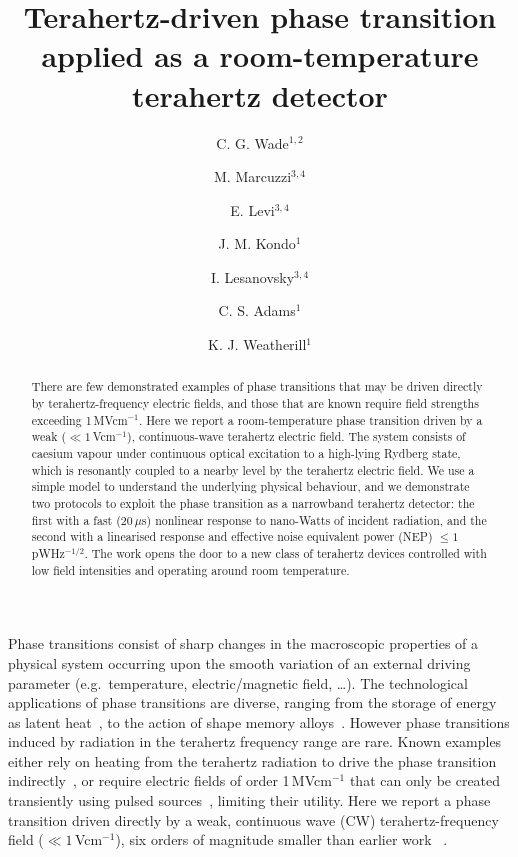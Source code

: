 \documentclass[twocolumn,aps,prl,nobibnotes,8pt]{revtex4-1}
\begin{document}
\title{Terahertz-driven phase transition applied as a room-temperature terahertz detector}
\author{C. G. Wade$^{1,2}$}
\author{M. Marcuzzi$^{3,4}$}
\author{E. Levi$^{3,4}$}
\author{J. M. Kondo$^{1}$}
\author{I. Lesanovsky$^{3,4}$}
\author{C. S. Adams$^1$}
\author{K. J. Weatherill$^1$}

\begin{abstract}
There are few demonstrated examples of phase transitions that may be driven directly by terahertz-frequency electric fields, and those that are known require field strengths exceeding 1\,MVcm$^{-1}$. 
Here we report a room-temperature phase transition driven by a weak ($\ll 1$\,Vcm$^{-1}$), continuous-wave terahertz electric field.
The system consists of caesium vapour under continuous optical excitation to a high-lying Rydberg state, which is resonantly coupled to a nearby level by the terahertz electric field. 
We use a simple model to understand the underlying physical behaviour, and we demonstrate two protocols to exploit the phase transition as a narrowband terahertz detector:
the first with a fast (20\,$\mu$s) nonlinear response to nano-Watts of incident radiation, and the second with a linearised response and effective noise equivalent power (NEP) $\leq 1$\,pWHz$^{-1/2}$. 
The work opens the door to a new class of terahertz devices controlled with low field intensities and operating around room temperature.
\end{abstract}
\maketitle 

\noindent 
Phase transitions consist of sharp changes in the macroscopic properties of a physical system occurring upon the smooth variation of an external driving parameter (e.g.~temperature, electric/magnetic field, \ldots).
The technological applications of phase transitions are diverse, ranging from the storage of energy as latent heat~\cite{Sharma09}, to the action of shape memory alloys~\cite{Jani14}.
However phase transitions induced by radiation in the terahertz frequency range are rare.
Known examples either rely on heating from the terahertz radiation to drive the phase transition indirectly~\cite{Prober93}, or require electric fields of order 1\,MVcm$^{-1}$ that can only be created transiently using pulsed sources~\cite{Liu12,Thompson15}, limiting their utility.
Here we report a phase transition driven directly by a weak, continuous wave (CW) terahertz-frequency field ($\ll 1$\,Vcm$^{-1}$), six orders of magnitude smaller than earlier work ~\cite{Liu12,Thompson15}. 
\end{document}
